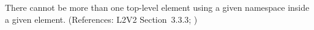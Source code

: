 There cannot be more than one top-level element using a given namespace
inside a given  element.  (References: L2V2 Section~3.3.3;
)

